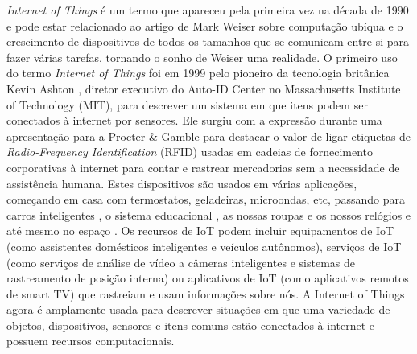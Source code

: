 \documentclass[conference]{IEEEtran}
\begin{document}

\textit{Internet of Things} é um termo que apareceu pela primeira vez na década
de 1990 e pode estar relacionado ao artigo de Mark Weiser sobre computação
ubíqua \cite{weiser1991computer} e o crescimento de dispositivos de todos
os tamanhos que se comunicam entre si para fazer várias tarefas, tornando
o sonho de Weiser uma realidade. O primeiro uso do termo \textit{Internet of Things}
foi em 1999 pelo pioneiro da tecnologia britânica Kevin Ashton \cite{KevinThat},
diretor executivo do Auto-ID Center no Massachusetts Institute of Technology (MIT),
para descrever um sistema em que itens podem ser conectados à internet por
sensores. Ele surgiu com a expressão durante uma apresentação para a Procter \& Gamble
para destacar o valor de ligar etiquetas de \textit{Radio-Frequency Identification}
(RFID) usadas em cadeias de fornecimento corporativas à internet para contar e
rastrear mercadorias sem a necessidade de assistência humana. Estes dispositivos
são usados em várias aplicações, começando em casa \cite{marikyan2019systematic}
com termostatos, geladeiras, microondas, etc, passando para carros inteligentes
\cite{arena2020overview}, o sistema educacional \cite{al2020survey}, as nossas roupas
e os nossos relógios \cite{niknejad2020comprehensive} e até mesmo no espaço
\cite{AkyildizInternet}. Os recursos de IoT podem incluir equipamentos
de IoT (como assistentes domésticos inteligentes e veículos autônomos), serviços
de IoT (como serviços de análise de vídeo a câmeras inteligentes e
sistemas de rastreamento de posição interna) ou aplicativos de IoT (como aplicativos
remotos de smart TV) que rastreiam e usam informações sobre nós. A Internet of
Things agora é amplamente usada para descrever situações em que uma variedade de
objetos, dispositivos, sensores e itens comuns estão conectados à internet e possuem
recursos computacionais.
\end{document}
